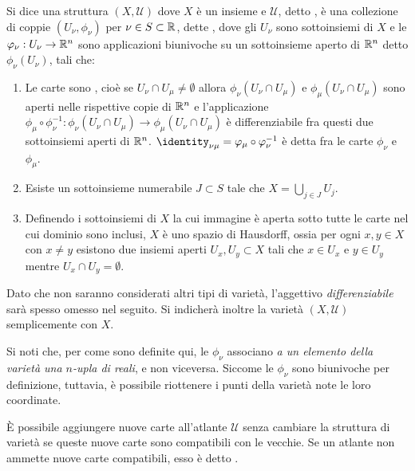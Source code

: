 \begin{definition}
  Si dice  una struttura $(X,\mathcal{U})$ dove $X$ è un insieme e $\mathcal{U}$, detto , è una collezione di coppie $(U_{\nu}, \phi_{\nu})$ per $\nu \in S \subset \mathbb{R}$, dette , dove gli $U_{\nu}$ sono sottoinsiemi di $X$ e le $\varphi_{\nu}:U_{\nu}\to \mathbb{R}^{n}$ sono applicazioni biunivoche su un sottoinsieme aperto di $\mathbb{R}^{n}$ detto $\phi_{\nu}(U_{\nu})$, tali che:
  \begin{enumerate}
    \item Le carte sono , cioè se $U_{\nu} \cap U_{\mu} \neq \emptyset$ allora $\phi_{\nu}(U_{\nu} \cap U_{\mu})$ e $\phi_{\mu}(U_{\nu} \cap U_{\mu})$ sono aperti nelle rispettive copie di $\mathbb{R}^{n}$ e l'applicazione $\phi_{\mu} \circ \phi_{\nu}^{-1}: \phi_{\nu}(U_{\nu} \cap U_{\mu}) \to \phi_{\mu}(U_{\nu} \cap U_{\mu})$ è differenziabile fra questi due sottoinsiemi aperti di $\mathbb{R}^{n}$. $\identity_{\nu\mu} = \phi_{\mu} \circ \phi_{\nu}^{-1}$ è detta  fra le carte $\phi_{\nu}$ e $\phi_{\mu}$.
    \item Esiste un sottoinsieme numerabile $J \subset S$ tale che $X = \bigcup_{j \in  J} U_j$.
    \item Definendo  i sottoinsiemi di $X$ la cui immagine è aperta sotto tutte le carte nel cui dominio sono inclusi, $X$ è uno spazio di Hausdorff, ossia per ogni $x,y \in X$ con $x \neq y$ esistono due insiemi aperti $U_x, U_y \subset X$ tali che $x \in U_x$ e $y \in  U_y$ mentre $U_x \cap U_y = \emptyset$.
  \end{enumerate}
   Dato che non saranno considerati altri tipi di varietà, l'aggettivo \emph{differenziabile} sarà spesso omesso nel seguito. Si indicherà inoltre la varietà $(X,\mathcal{U})$ semplicemente con $X$.
\end{definition}
\begin{remark}
  Si noti che, per come sono definite qui, le $\phi_{\nu}$ associano \emph{a un elemento della varietà una $n$-upla di reali}, e non viceversa. Siccome le $\phi_{\nu}$ sono biunivoche per definizione, tuttavia, è possibile riottenere i punti della varietà note le loro coordinate.
\end{remark}
\begin{remark}
  È possibile aggiungere nuove carte all'atlante $\mathcal{U}$ senza cambiare la struttura di varietà se queste nuove carte sono compatibili con le vecchie. Se un atlante non ammette nuove carte compatibili, esso è detto .
\end{remark}
